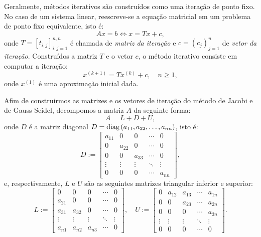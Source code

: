 Geralmente, métodos iterativos são construídos como uma iteração de ponto fixo. No caso de um sistema linear, reescreve-se a equação matricial em um problema de ponto fixo equivalente, isto é:
\begin{equation*}
  Ax = b \Leftrightarrow x = Tx + c,
\end{equation*}
onde $T = [t_{i,j}]_{i,j=1}^{n,n}$ é chamada de \emph{matriz da iteração} e $c = (c_j)_{j=1}^n$ de \emph{vetor da iteração}. Construídos a matriz $T$ e o vetor $c$, o método iterativo consiste em computar a iteração:
\begin{equation*}
  x^{(k+1)} = Tx^{(k)} + c,\quad n\geq 1, 
\end{equation*}
onde $x^{(1)}$ é uma aproximação inicial dada.

Afim de construirmos as matrizes e os vetores de iteração do método de Jacobi e de Gauss-Seidel, decompomos a matriz $A$ da seguinte forma:
\begin{equation*}
  A = L + D + U,
\end{equation*}
onde $D$ é a matriz diagonal $D = \operatorname{diag}\,(a_{11}, a_{22}, \ldots, a_{nn})$, isto é:
\begin{equation*}
  D := \begin{bmatrix}
    a_{11} & 0 & 0 & \cdots & 0\\
    0 & a_{22} & 0 & \cdots & 0\\
    0 & 0 & a_{33} & \cdots & 0\\
    \vdots & \vdots & \vdots & \ddots & \vdots\\
    0 & 0 & 0 & \cdots & a_{nn}
  \end{bmatrix},
\end{equation*}
e, respectivamente, $L$ e $U$ são as seguintes matrizes triangular inferior e superior:
\begin{equation*}
  L := \begin{bmatrix}
    0 & 0 & 0 & \cdots & 0\\
    a_{21} & 0 & 0 & \cdots & 0\\
    a_{31} & a_{32} & 0 &\cdots & 0\\
    \vdots & \vdots & \vdots & \ddots & \vdots\\
    a_{n1} & a_{n2} & a_{n3} & \cdots & 0
  \end{bmatrix},\quad
  U := \begin{bmatrix}
    0 & a_{12} & a_{13} & \cdots & a_{1n}\\
    0 & 0 & a_{23} & \cdots & a_{2n}\\
    0 & 0 & 0 & \cdots & a_{3n}\\
    \vdots & \vdots & \vdots & \ddots & \vdots\\
    0 & 0 & 0 & \cdots & 0
  \end{bmatrix}.
\end{equation*}

